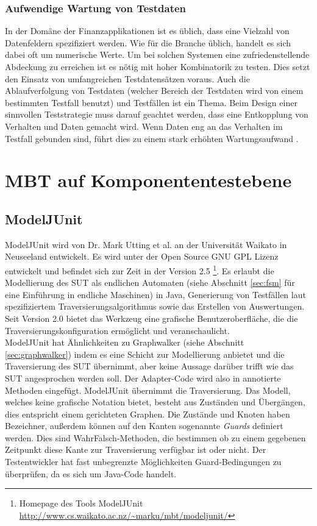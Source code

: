 \subsubsection{Aufwendige Wartung von Testdaten}
In der Domäne der Finanzapplikationen ist es üblich, dass eine Vielzahl von Datenfeldern spezifiziert werden. Wie für die Branche üblich, handelt es sich dabei oft um numerische Werte. Um bei solchen Systemen eine zufriedenstellende Abdeckung zu erreichen ist es nötig mit hoher Kombinatorik zu testen. Dies setzt den Einsatz von umfangreichen Testdatensätzen voraus. Auch die Ablaufverfolgung von Testdaten (welcher Bereich der Testdaten wird von einem bestimmten Testfall benutzt) und Testfällen ist ein Thema. Beim Design einer sinnvollen Teststrategie muss darauf geachtet werden, dass eine Entkopplung von Verhalten und Daten gemacht wird. Wenn Daten eng an das Verhalten im Testfall gebunden sind, führt dies zu einem stark erhöhten Wartungsaufwand \cite{baker_model-driven_2005}. 

\section{MBT auf Komponententestebene}
\label{sec:mbt_unit}

\subsection{ModelJUnit}
\label{sec:modeljunit}
ModelJUnit wird von Dr. Mark Utting et al. an der Universität Waikato in Neuseeland entwickelt. Es wird unter der Open Source GNU GPL Lizenz entwickelt und befindet sich zur Zeit in der Version 2.5 \footnote{Homepage des Tools ModelJUnit \url{http://www.cs.waikato.ac.nz/~marku/mbt/modeljunit/}}. Es erlaubt die Modellierung des \Gls{SUT} als endlichen Automaten (siehe Abschnitt \ref{sec:fsm} für eine Einführung in endliche Maschinen) in Java, Generierung von Testfällen laut spezifiziertem Traversierungsalgorithmus sowie das Erstellen von Auswertungen. Seit Version 2.0 bietet das Werkzeug eine grafische Benutzeroberfläche, die die Traversierungskonfiguration ermöglicht und veranschaulicht.\\
ModelJUnit hat Ähnlichkeiten zu Graphwalker (siehe Abschnitt \ref{sec:graphwalker}) indem es eine Schicht zur Modellierung anbietet und die Traversierung des \gls{SUT} übernimmt, aber keine Aussage darüber trifft wie das \gls{SUT} angesprochen werden soll. Der Adapter-Code wird also in annotierte Methoden eingefügt. ModelJUnit übernimmt die Traversierung. Das Modell, welches keine grafische Notation bietet, besteht aus Zuständen und Übergängen, dies entspricht einem gerichteten Graphen. Die Zustände und Knoten haben Bezeichner, außerdem können auf den Kanten sogenannte \textit{Guards} definiert werden. Dies sind WahrFalsch-Methoden, die bestimmen ob zu einem gegebenen Zeitpunkt diese Kante zur Traversierung verfügbar ist oder nicht. Der Testentwickler hat fast unbegrenzte Möglichkeiten Guard-Bedingungen zu überprüfen, da es sich um Java-Code handelt.

